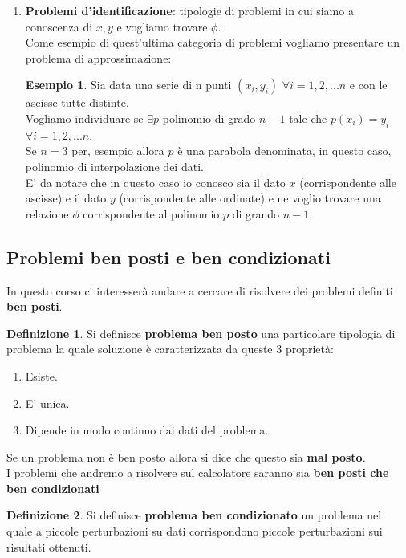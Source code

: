 \documentclass[12pt, a4paper]{book}
\theoremstyle{definition}
\newtheorem{exmp}{Esempio}[section]
\newtheorem{defn}{Definizione}[section]
\begin{document}
\begin{flushleft}
\begin{enumerate}
\item \textbf{Problemi d'identificazione}: tipologie di problemi in cui siamo a conoscenza di $x, y$ e vogliamo trovare $\phi$.\\
Come esempio di quest'ultima categoria di problemi vogliamo presentare un problema di approssimazione:
\begin{exmp}
Sia data una serie di n punti $(x_{i}, y_{i})$ $\forall i = 1,2, ...  n$ e con le ascisse tutte distinte. \\
Vogliamo individuare se $\exists p $ polinomio di grado $n-1$ tale che $p(x_{i}) = y_{i}$ $\forall i = 1,2, ...  n$.\\
Se $n = 3$ per,  esempio allora $p$ è una parabola denominata,  in questo caso,  polinomio di interpolazione dei dati. \\
E' da notare che in questo caso io conosco sia il dato $x$ (corrispondente alle ascisse) e il dato $y$ (corrispondente alle ordinate) e ne voglio trovare una relazione $\phi$ corrispondente al polinomio $p$ di grando $n-1$.
\end{exmp}
\end{enumerate}
\end{flushleft}

\subsection{Problemi ben posti e ben condizionati}
\begin{flushleft}

In questo corso ci interesserà andare a cercare di risolvere dei problemi definiti \textbf{ben posti}.

\begin{defn}
Si definisce \textbf{problema ben posto} una particolare tipologia di problema la quale soluzione è caratterizzata da queste 3 proprietà: 
\begin{enumerate}
\item Esiste.
\item E' unica.
\item Dipende in modo continuo dai dati del problema.
\end{enumerate}
\end{defn}
Se un problema non è ben posto allora si dice che questo sia \textbf{mal posto}.\\
I problemi che andremo a risolvere sul calcolatore saranno sia \textbf{ben posti che ben condizionati}
\begin{defn}
Si definisce \textbf{problema ben condizionato} un problema nel quale a piccole perturbazioni su dati corrispondono piccole perturbazioni sui risultati ottenuti.
\end{defn}
\end{flushleft}
\end{document}
